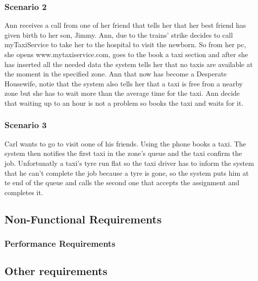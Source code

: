 		\subsubsection{Scenario 2}
		Ann receives a call from one of her friend that tells her that her best friend has given birth to her son, Jimmy. Ann, due to the trains' strike decides to call myTaxiService to take her to the hospital to visit the newborn. So from her pc, she opens www.mytaxiservice.com, goes to the book a taxi section and after she has inserted all the needed data the system tells her that no taxis are available at the moment in the specified zone. Ann that now has become a Desperate Housewife, notie that the system also tells her that a taxi is free fron a nearby zone but she has to wait more than the average time for the taxi. Ann decide that waiting up to an hour is not a problem so books the taxi and waits for it. 
		
		\subsubsection{Scenario 3}
		Carl wants to go to visit oone of his friends. Using the phone books a taxi. The system then notifies the first taxi in the zone's queue and the taxi confirm the job. Unfortunatly a taxi's tyre run flat so the taxi driver has to inform the system that he can't complete the job because a tyre is gone, so the system puts him at te end of the queue and calls the second one that accepts the assignment and completes it.
		
	\subsection{Non-Functional Requirements}
		\subsubsection{Performance Requirements}
	\subsection{Other requirements}
	